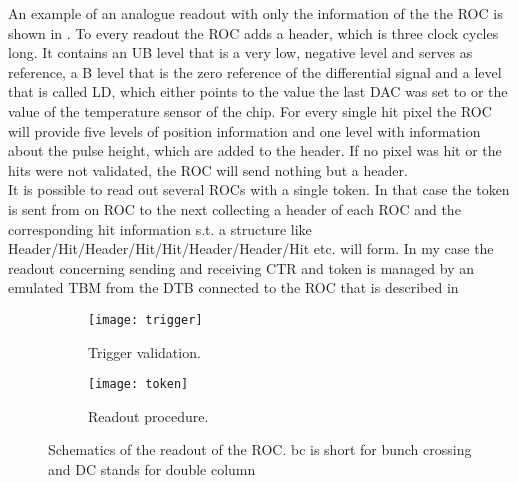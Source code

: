 An example of an analogue readout with only the information of the the \ac{ROC} is shown in . To every readout the \ac{ROC} adds a header, which is three clock cycles long. It contains an \ac{UB} level that is a very low, negative level and serves as reference, a \ac{B} level that is the zero reference of the differential signal and a level that is called \ac{LD}, which either points to the value the last \ac{DAC} was set to or the value of the temperature sensor of the chip. For every single hit pixel the \ac{ROC} will provide five levels of position information and one level with information about the pulse height, which are added to the header. If no pixel was hit or the hits were not validated, the \ac{ROC} will send nothing but a header.\\
It is possible to read out several \ac{ROC}s with a single token. In that case the token is sent from on \ac{ROC} to the next collecting a header of each \ac{ROC} and the corresponding hit information s.t. a structure like Header/Hit/Header/Hit/Hit/Header/Header/Hit etc. will form. In my case the readout concerning sending and receiving \ac{CTR} and token is managed by an emulated \ac{TBM} from the \ac{DTB} connected to the \ac{ROC} that is described in 
\begin{figure}[ht]
	\centering
	\begin{subfigure}[b]{0.37\textwidth}
        \texttt{[image: trigger]}
		\caption{Trigger validation.}
		\label{ptrig}
	\end{subfigure}
	\hfill
	\begin{subfigure}[b]{0.57\textwidth}
		\texttt{[image: token]}
		\caption{Readout procedure.}
		\label{ptok}
	\end{subfigure}
	\caption{Schematics of the readout of the \ac{ROC}. bc is short for bunch crossing and DC stands for double column}
	\label{pro}
\end{figure}
